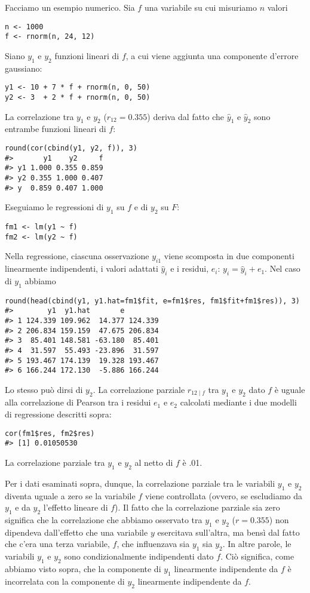 Facciamo un esempio numerico.
Sia $f$ una variabile su cui misuriamo $n$ valori 
\begin{lstlisting}
n <- 1000 
f <- rnorm(n, 24, 12)
\end{lstlisting}
Siano $y_1$ e $y_2$ funzioni lineari di $f$, a cui viene aggiunta una componente d'errore gaussiano: 
\begin{lstlisting}
y1 <- 10 + 7 * f + rnorm(n, 0, 50) 
y2 <- 3  + 2 * f + rnorm(n, 0, 50)
\end{lstlisting}
La correlazione tra $y_1$ e $y_2$ ($r_{12}= 0.355$) deriva dal fatto che $\hat{y}_1$ e $\hat{y}_2$ sono entrambe funzioni lineari di $f$:
\begin{lstlisting}
round(cor(cbind(y1, y2, f)), 3)
#>       y1    y2     f
#> y1 1.000 0.355 0.859
#> y2 0.355 1.000 0.407
#> y  0.859 0.407 1.000
\end{lstlisting}
Eseguiamo le regressioni di
$y_1$ su $f$ e di $y_2$ su $F$: 
\begin{lstlisting}
fm1 <- lm(y1 ~ f) 
fm2 <- lm(y2 ~ f)
\end{lstlisting}
Nella regressione, ciascuna osservazione $y_{i1}$ viene scomposta in due componenti linearmente indipendenti, i valori adattati $\hat{y}_{i}$ e
i residui, $e_{i}$: $y_i = \hat{y}_i + e_1$. Nel caso di $y_1$ abbiamo
\begin{lstlisting}
round(head(cbind(y1, y1.hat=fm1$fit, e=fm1$res, fm1$fit+fm1$res)), 3)
#>        y1  y1.hat       e        
#> 1 124.339 109.962  14.377 124.339
#> 2 206.834 159.159  47.675 206.834
#> 3  85.401 148.581 -63.180  85.401
#> 4  31.597  55.493 -23.896  31.597
#> 5 193.467 174.139  19.328 193.467
#> 6 166.244 172.130  -5.886 166.244
\end{lstlisting}
Lo stesso può dirsi di $y_2$.  
La correlazione parziale $r_{12 \mid f}$ tra $y_1$ e $y_2$ dato $f$ è uguale alla correlazione di Pearson tra i residui $e_1$ e $e_2$ calcolati mediante i due modelli di regressione descritti sopra:  
\begin{lstlisting}
cor(fm1$res, fm2$res)
#> [1] 0.01050530
\end{lstlisting}
La correlazione parziale tra $y_1$ e $y_2$ al netto di $f$ è .01.

Per i dati esaminati sopra, dunque, la correlazione parziale tra le variabili $y_1$ e $y_2$ diventa uguale a zero se la variabile $f$ viene controllata (ovvero, se escludiamo da $y_1$ e da $y_2$ l'effetto lineare di $f$).
Il fatto che la correlazione parziale sia zero significa che la correlazione che abbiamo osservato tra $y_1$ e $y_2$ ($r = 0.355$) non dipendeva dall'effetto che una variabile $y$ esercitava sull'altra, ma bensì dal fatto che c'era una terza variabile, $f$, che  influenzava sia $y_1$ sia  $y_2$. 
In altre parole, le variabili $y_1$ e $y_2$ sono condizionalmente indipendenti dato $f$.
Ciò significa, come abbiamo visto sopra, che la componente di $y_1$ linearmente indipendente da $f$ è incorrelata con la componente di $y_2$ linearmente indipendente da $f$. 
  
